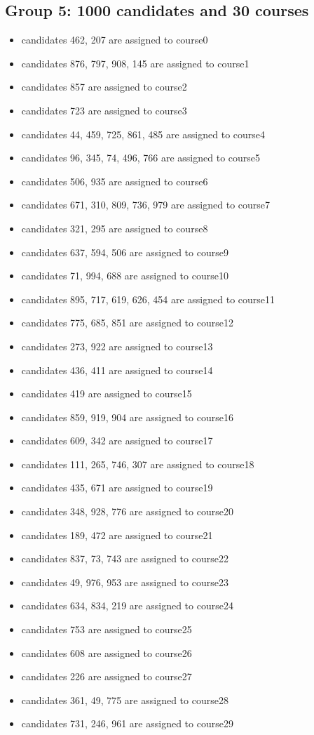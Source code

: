 \documentclass[twoside,twocolumn]{article}
\begin{document}
    \subsection{Group 5: 1000 candidates and 30 courses}
    \begin{itemize}
        \item candidates 462, 207 are assigned to course0
        \item candidates 876, 797, 908, 145 are assigned to course1
        \item candidates 857 are assigned to course2
        \item candidates 723 are assigned to course3
        \item candidates 44, 459, 725, 861, 485 are assigned to course4
        \item candidates 96, 345, 74, 496, 766 are assigned to course5
        \item candidates 506, 935 are assigned to course6
        \item candidates 671, 310, 809, 736, 979 are assigned to course7
        \item candidates 321, 295 are assigned to course8
        \item candidates 637, 594, 506 are assigned to course9
        \item candidates 71, 994, 688 are assigned to course10
        \item candidates 895, 717, 619, 626, 454 are assigned to course11
        \item candidates 775, 685, 851 are assigned to course12
        \item candidates 273, 922 are assigned to course13
        \item candidates 436, 411 are assigned to course14
        \item candidates 419 are assigned to course15
        \item candidates 859, 919, 904 are assigned to course16
        \item candidates 609, 342 are assigned to course17
        \item candidates 111, 265, 746, 307 are assigned to course18
        \item candidates 435, 671 are assigned to course19
        \item candidates 348, 928, 776 are assigned to course20
        \item candidates 189, 472 are assigned to course21
        \item candidates 837, 73, 743 are assigned to course22
        \item candidates 49, 976, 953 are assigned to course23
        \item candidates 634, 834, 219 are assigned to course24
        \item candidates 753 are assigned to course25
        \item candidates 608 are assigned to course26
        \item candidates 226 are assigned to course27
        \item candidates 361, 49, 775 are assigned to course28
        \item candidates 731, 246, 961 are assigned to course29
    \end{itemize}
\end{document}
